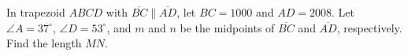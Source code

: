 In trapezoid $ ABCD$ with $ \overline{BC}\parallel\overline{AD}$, let $ BC=1000$ and $ AD=2008$. Let $ \angle A=37^\circ$, $ \angle D=53^\circ$, and $ m$ and $ n$ be the midpoints of $ \overline{BC}$ and $ \overline{AD}$, respectively. Find the length $ MN$.